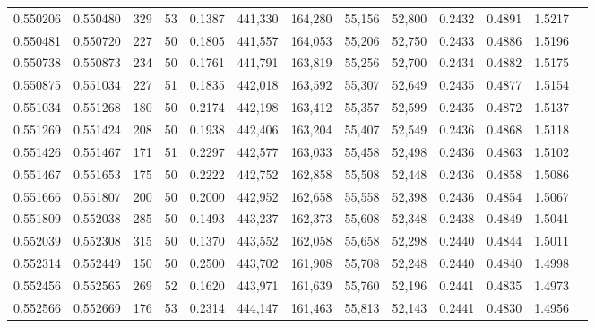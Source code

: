 \begin{tabular}{rrrrrrrrrrrrr}
0.550206 & 0.550480 &   329 &  53 &                                     0.1387 & 441,330 & 164,280 &  55,156 &  52,800 & 0.2432 & 0.4891 & 1.5217 \\
0.550481 & 0.550720 &   227 &  50 &                                     0.1805 & 441,557 & 164,053 &  55,206 &  52,750 & 0.2433 & 0.4886 & 1.5196 \\
0.550738 & 0.550873 &   234 &  50 &                                     0.1761 & 441,791 & 163,819 &  55,256 &  52,700 & 0.2434 & 0.4882 & 1.5175 \\
0.550875 & 0.551034 &   227 &  51 &                                     0.1835 & 442,018 & 163,592 &  55,307 &  52,649 & 0.2435 & 0.4877 & 1.5154 \\
0.551034 & 0.551268 &   180 &  50 &                                     0.2174 & 442,198 & 163,412 &  55,357 &  52,599 & 0.2435 & 0.4872 & 1.5137 \\
0.551269 & 0.551424 &   208 &  50 &                                     0.1938 & 442,406 & 163,204 &  55,407 &  52,549 & 0.2436 & 0.4868 & 1.5118 \\
0.551426 & 0.551467 &   171 &  51 &                                     0.2297 & 442,577 & 163,033 &  55,458 &  52,498 & 0.2436 & 0.4863 & 1.5102 \\
0.551467 & 0.551653 &   175 &  50 &                                     0.2222 & 442,752 & 162,858 &  55,508 &  52,448 & 0.2436 & 0.4858 & 1.5086 \\
0.551666 & 0.551807 &   200 &  50 &                                     0.2000 & 442,952 & 162,658 &  55,558 &  52,398 & 0.2436 & 0.4854 & 1.5067 \\
0.551809 & 0.552038 &   285 &  50 &                                     0.1493 & 443,237 & 162,373 &  55,608 &  52,348 & 0.2438 & 0.4849 & 1.5041 \\
0.552039 & 0.552308 &   315 &  50 &                                     0.1370 & 443,552 & 162,058 &  55,658 &  52,298 & 0.2440 & 0.4844 & 1.5011 \\
0.552314 & 0.552449 &   150 &  50 &                                     0.2500 & 443,702 & 161,908 &  55,708 &  52,248 & 0.2440 & 0.4840 & 1.4998 \\
0.552456 & 0.552565 &   269 &  52 &                                     0.1620 & 443,971 & 161,639 &  55,760 &  52,196 & 0.2441 & 0.4835 & 1.4973 \\
0.552566 & 0.552669 &   176 &  53 &                                     0.2314 & 444,147 & 161,463 &  55,813 &  52,143 & 0.2441 & 0.4830 & 1.4956 \\

\end{tabular}
